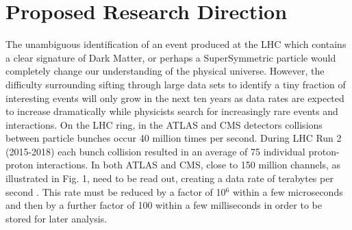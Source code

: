 \documentclass[preprint,12pt]{elsarticle}
\begin{document}
\section{Proposed Research Direction}
The unambiguous identification of an event produced at the 
LHC which contains a clear signature of Dark Matter, or perhaps 
a SuperSymmetric particle would completely change our understanding 
of the physical universe. However, the difficulty surrounding sifting through 
large data sets to identify a tiny fraction of interesting events 
will only grow in the next ten years as data rates are expected to 
increase dramatically while physicists search for increasingly rare 
events and interactions. On the LHC ring, in the ATLAS and CMS detectors 
collisions between particle bunches occur 40 million times per second. 
During LHC Run 2 (2015-2018) each bunch collision resulted in an average of 
75 individual proton-proton interactions. In both ATLAS and CMS, close 
to 150 million channels, as illustrated in Fig. 1, need to be read out, 
creating a data rate of terabytes per second \cite{RoadMapComputing, big_data_computing}. This rate must be 
reduced by a factor of 10$^{6}$ within a few microseconds and then 
by a further factor of 100 within a few milliseconds in order to be stored
for later analysis.
\end{document}
